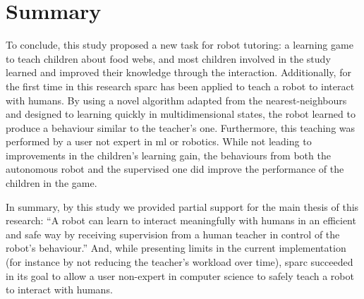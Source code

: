 \section{Summary}

To conclude, this study proposed a new task for robot tutoring: a learning game to teach children about food webs, and most children involved in the study learned and improved their knowledge through the interaction. Additionally, for the first time in this research \gls{sparc} has been applied to teach a robot to interact with humans. By using a novel algorithm adapted from the nearest-neighbours and designed to learning quickly in multidimensional states, the robot learned to produce a behaviour similar to the teacher's one. Furthermore, this teaching was performed by a user not expert in \gls{ml} or robotics. While not leading to improvements in the children's learning gain, the behaviours from both the autonomous robot and the supervised one did improve the performance of the children in the game. 

In summary, by this study we provided partial support for the main thesis of this research: ``A robot can learn to interact meaningfully with humans in an efficient and safe way by receiving supervision from a human teacher in control of the robot's behaviour.'' And, while presenting limits in the current implementation (for instance by not reducing the teacher's workload over time), \gls{sparc} succeeded in its goal to allow a user non-expert in computer science to safely teach a robot to interact with humans. 